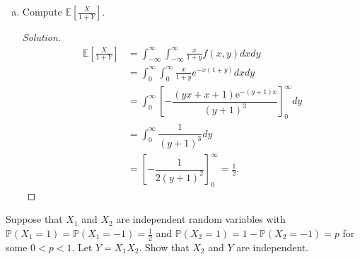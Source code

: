 \documentclass[addpoints, 11pt]{exam}
\newcommand*{\prob}{\mathds{P}}
\newcommand*{\E}{\mathds{E}}
\newenvironment{question}[1]{\smallskip\noindent\color{crimson}{\bf Question #1.}}{}
\begin{document}
\begin{enumerate}[(a)]
    \color{crimson}
    \item  Compute $\E[\frac{X}{1+Y}]$.
    \normalcolor
    
    \begin{proof}[Solution]
        \begin{align*}
            \E\left[\frac{X}{1+Y}\right]
            &= \int^{\infty}_{-\infty}\int^{\infty}_{-\infty} \frac{x}{1+y}f(x, y) dxdy \\
            &= \int^{\infty}_{0}\int^{\infty}_{0} \frac{x}{1+y}e^{-x(1+y)} dxdy \\
            &= \int^{\infty}_{0} \left[-\dfrac{\left(yx+x+1\right)\mathrm{e}^{-\left(y+1\right)x}}{\left(y+1\right)^3}\right]^{\infty}_0 dy \\
            &= \int^{\infty}_{0} \dfrac{1}{\left(y+1\right)^3} dy \\
            &= \left[-\dfrac{1}{2\left(y+1\right)^2}\right]^{\infty}_0 = \frac{1}{2}.
        \end{align*}
    \end{proof}
\end{enumerate}

\newpage

\begin{question}{4}
     Suppose that $X_1$ and $X_2$ are independent random variables with $\prob(X_1 = 1) = \prob(X_1 = -1) = \frac{1}{2}$ and $\prob(X_2 = 1) = 1 - \prob(X_2 = -1) = p$ for some $0 < p < 1$. Let $Y = X_1X_2$. Show that $X_2$ and $Y$ are independent.
\end{question}
\end{document}
